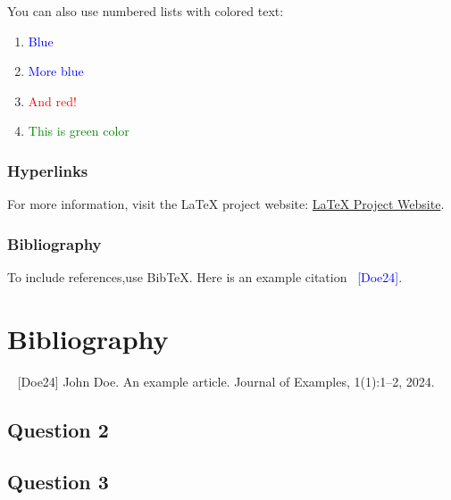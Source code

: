 \documentclass{article}
\begin{document}
You can also use numbered lists with colored text:
\begin{enumerate}
    \item \textcolor{blue}{Blue}
    \item \textcolor{blue}{More blue}
    \item \textcolor{red}{And red!}
    \item \textcolor{green}{This is green color}
\end{enumerate}

\subsubsection{Hyperlinks}

For more information, visit the LaTeX project website: \href{https://www.latex-project.org/}{LaTeX Project Website}.

\subsubsection{Bibliography}

To include references,use BibTeX. Here is an example citation~\cite{Doe24} \textcolor{blue}{[Doe24]}.

\newpage
 
\section*{ Bibliography}
~ [Doe24] John Doe. An example article. Journal of Examples, 1(1):1–2, 2024.
 
\subsection{Question 2}
\subsection{Question 3}
\end{document}
